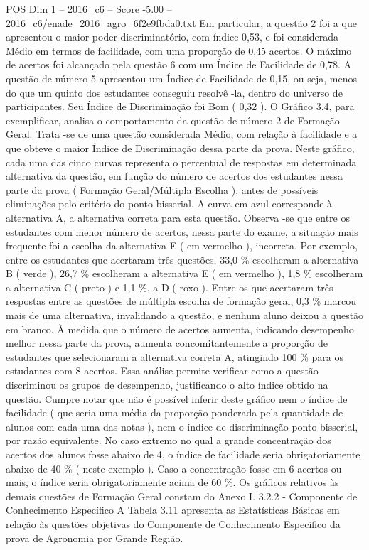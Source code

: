 \begin{textsample}{POS Dim 1 – 2016\_c6 – Score -5.00 – 2016\_c6/enade\_2016\_agro\_6f2e9fbda0.txt}
Em particular, a questão 2 foi a que apresentou o maior poder discriminatório, com índice 0,53, e foi considerada Médio em termos de facilidade, com uma proporção de 0,45 acertos.
O máximo de acertos foi alcançado pela questão 6 com um Índice de Facilidade de 0,78.
A questão de número 5 apresentou um Índice de Facilidade de 0,15, ou seja, menos do que um quinto dos estudantes conseguiu resolvê -la, dentro do universo de participantes.
Seu Índice de Discriminação foi Bom ( 0,32 ).
O Gráfico 3.4, para exemplificar, analisa o comportamento da questão de número 2 de Formação Geral.
Trata -se de uma questão considerada Médio, com relação à facilidade e a que obteve o maior Índice de Discriminação dessa parte da prova.
Neste gráfico, cada uma das cinco curvas representa o percentual de respostas em determinada alternativa da questão, em função do número de acertos dos estudantes nessa parte da prova ( Formação Geral/Múltipla Escolha ), antes de possíveis eliminações pelo critério do ponto-bisserial.
A curva em azul corresponde à alternativa A, a alternativa correta para esta questão.
Observa -se que entre os estudantes com menor número de acertos, nessa parte do exame, a situação mais frequente foi a escolha da alternativa E ( em vermelho ), incorreta.
Por exemplo, entre os estudantes que acertaram três questões, 33,0 \% escolheram a alternativa B ( verde ), 26,7 \% escolheram a alternativa E ( em vermelho ), 1,8 \% escolheram a alternativa C ( preto ) e 1,1 \%, a D ( roxo ).
Entre os que acertaram três respostas entre as questões de múltipla escolha de formação geral, 0,3 \% marcou mais de uma alternativa, invalidando a questão, e nenhum aluno deixou a questão em branco.
À medida que o número de acertos aumenta, indicando desempenho melhor nessa parte da prova, aumenta concomitantemente a proporção de estudantes que selecionaram a alternativa correta A, atingindo 100 \% para os estudantes com 8 acertos.
Essa análise permite verificar como a questão discriminou os grupos de desempenho, justificando o alto índice obtido na questão.
Cumpre notar que não é possível inferir deste gráfico nem o índice de facilidade ( que seria uma média da proporção ponderada pela quantidade de alunos com cada uma das notas ), nem o índice de discriminação ponto-bisserial, por razão equivalente.
No caso extremo no qual a grande concentração dos acertos dos alunos fosse abaixo de 4, o índice de facilidade seria obrigatoriamente abaixo de 40 \% ( neste exemplo ).
Caso a concentração fosse em 6 acertos ou mais, o índice seria obrigatoriamente acima de 60 \%.
Os gráficos relativos às demais questões de Formação Geral constam do Anexo I. 3.2.2 - Componente de Conhecimento Específico A Tabela 3.11 apresenta as Estatísticas Básicas em relação às questões objetivas do Componente de Conhecimento Específico da prova de Agronomia por Grande Região.

\end{textsample}
